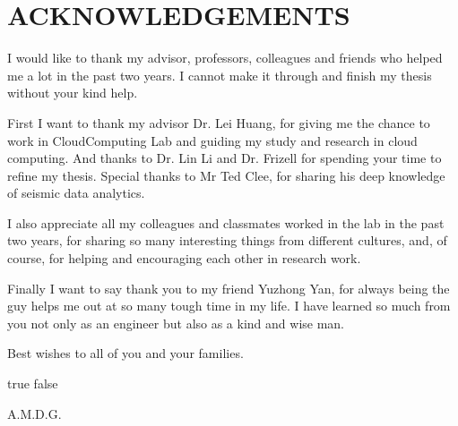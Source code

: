 %
%
%


\chapter*{ACKNOWLEDGEMENTS}

I would like to thank my advisor, professors, colleagues and friends who helped me a lot in the past two years. I cannot make it through and finish my thesis without your kind help.

First I want to thank my advisor Dr. Lei Huang, for giving me the chance to work in CloudComputing Lab and guiding my study and research in cloud computing. And thanks to Dr. Lin Li and Dr. Frizell for spending your time to refine my thesis. Special thanks to Mr Ted Clee, for sharing his deep knowledge of seismic data analytics.

I also appreciate all my colleagues and classmates worked in the lab in the past two years, for sharing so many interesting things from different cultures, and, of course, for helping and encouraging each other in research work.

Finally I want to say thank you to my friend Yuzhong Yan, for always being the guy helps me out at so many tough time in my life. I have learned so much from you not only as an engineer but also as a kind and wise man. 

Best wishes to all of you and your families.

\pagebreak{}

\ifx true false
\vspace*{\fill}
\begin{center}
A.M.D.G.
\end{center}
\vspace*{\fill}
\pagebreak{}
\fi
